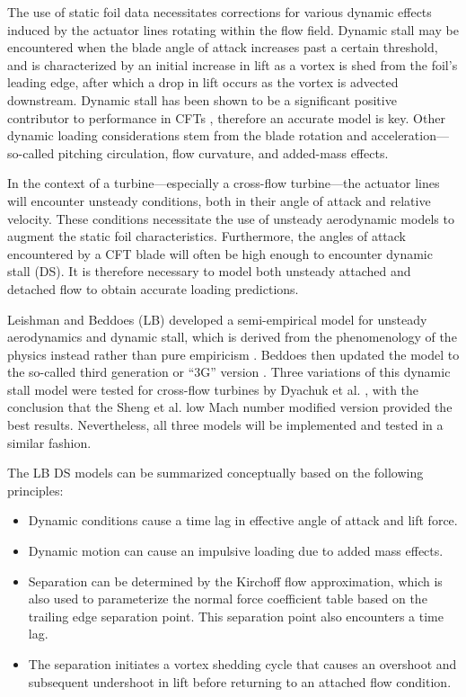The use of static foil data necessitates corrections for various dynamic effects
induced by the actuator lines rotating within the flow field. Dynamic stall may
be encountered when the blade angle of attack increases past a certain
threshold, and is characterized by an initial increase in lift as a vortex is
shed from the foil's leading edge, after which a drop in lift occurs as the
vortex is advected downstream. Dynamic stall has been shown to be a significant
positive contributor to performance in CFTs \cite{Para2002, Urbina2013},
therefore an accurate model is key. Other dynamic loading considerations stem
from the blade rotation and acceleration---so-called pitching circulation, flow
curvature, and added-mass effects.

In the context of a turbine---especially a cross-flow turbine---the actuator
lines will encounter unsteady conditions, both in their angle of attack and
relative velocity. These conditions necessitate the use of unsteady aerodynamic
models to augment the static foil characteristics. Furthermore, the angles of
attack encountered by a CFT blade will often be high enough to encounter dynamic
stall (DS). It is therefore necessary to model both unsteady attached and
detached flow to obtain accurate loading predictions.


Leishman and Beddoes (LB) developed a semi-empirical model for unsteady
aerodynamics and dynamic stall, which is derived from the phenomenology of the
physics instead rather than pure empiricism \cite{Leishman1989}. Beddoes then
updated the model to the so-called third generation or ``3G'' version
\cite{Beddoes1993}. Three variations of this dynamic stall model were tested for
cross-flow turbines by Dyachuk et al. \cite{Dyachuk2014}, with the conclusion
that the Sheng et al. low Mach number modified version \cite{Sheng2008} provided
the best results. Nevertheless, all three models will be implemented and tested
in a similar fashion.

The LB DS models can be summarized conceptually based on the following principles:
\begin{itemize}
    \item Dynamic conditions cause a time lag in effective angle of attack and
    lift force.
    
    \item Dynamic motion can cause an impulsive loading due to added mass
    effects.
    
    \item Separation can be determined by the Kirchoff flow approximation, which
    is also used to parameterize the normal force coefficient table based on the
    trailing edge separation point. This separation point also encounters a time
    lag.
    
    \item The separation initiates a vortex shedding cycle that causes an
    overshoot and subsequent undershoot in lift before returning to an attached
    flow condition.
\end{itemize}


